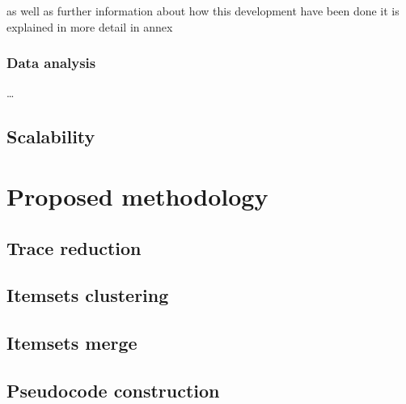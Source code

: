 as well as further information about how this development have
been done it is explained in more detail in annex 

\subsubsection{Data analysis}

\ldots


\subsection{Scalability}\label{ss:scalability}

\section{Proposed methodology}

\subsection{Trace reduction}

\subsection{Itemsets clustering}

\subsection{Itemsets merge}

\subsection{Pseudocode construction}

